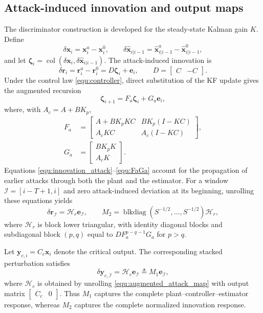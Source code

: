 \subsection{Attack-induced innovation and output maps}
The discriminator construction is developed for the steady-state Kalman gain $K$. Define
\[
\delta\mathbf{x}_i=\mathbf{x}_i^a-\mathbf{x}_i^0,\qquad
\delta\hat{\mathbf{x}}_{i|i-1}
=\hat{\mathbf{x}}_{i|i-1}^a-\hat{\mathbf{x}}_{i|i-1}^0,
\]
and let $\boldsymbol{\zeta}_i=\operatorname{col}(\delta\mathbf{x}_i,
\delta\hat{\mathbf{x}}_{i|i-1})$. The attack-induced innovation is
\begin{equation}\label{equ:innovation_attack}
\delta\mathbf{r}_i
=\mathbf{r}_i^a-\mathbf{r}_i^0
=D\boldsymbol{\zeta}_i+\mathbf{e}_i,\qquad
D=\begin{bmatrix}C&-C\end{bmatrix}.
\end{equation}
Under the control law \eqref{equ:controller}, direct substitution of the KF update gives the augmented recursion
\begin{equation}\label{equ:augmented_attack_map}
\boldsymbol{\zeta}_{i+1}=F_a\boldsymbol{\zeta}_i+G_a\mathbf{e}_i,
\end{equation}
where, with $A_c=A+BK_p$,
\begin{align}
F_a&=
\begin{bmatrix}
A+BK_pKC & BK_p(I-KC)\\
A_cKC & A_c(I-KC)
\end{bmatrix}, \nonumber\\
G_a&=
\begin{bmatrix}
BK_pK\\ A_cK
\end{bmatrix}. \label{equ:FaGa}
\end{align}
Equations \eqref{equ:innovation_attack}--\eqref{equ:FaGa} account for the propagation of earlier attacks through both the plant and the estimator. For a window $\mathcal I=[i-T+1,i]$ and zero attack-induced deviation at its beginning, unrolling these equations yields
\begin{equation}\label{equ:M2}
\delta\mathbf{r}_{\mathcal I}=\mathcal{H}_r\mathbf{e}_{\mathcal I},\qquad
M_2=\operatorname{blkdiag}(S^{-1/2},\ldots,S^{-1/2})\mathcal{H}_r,
\end{equation}
where $\mathcal{H}_r$ is block lower triangular, with identity diagonal blocks and subdiagonal block $(p,q)$ equal to $DF_a^{p-q-1}G_a$ for $p>q$.

Let $\mathbf{y}_{c,i}=C_c\mathbf{x}_i$ denote the critical output. The corresponding stacked perturbation satisfies
\begin{equation}\label{equ:M1}
\delta\mathbf{y}_{c,\mathcal I}=\mathcal{H}_c\mathbf{e}_{\mathcal I}
\triangleq M_1\mathbf{e}_{\mathcal I},
\end{equation}
where $\mathcal{H}_c$ is obtained by unrolling \eqref{equ:augmented_attack_map} with output matrix $\begin{bmatrix}C_c&0\end{bmatrix}$. Thus $M_1$ captures the complete plant--controller--estimator response, whereas $M_2$ captures the complete normalized innovation response.

